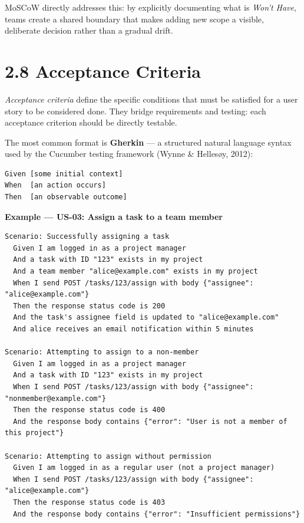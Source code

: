 \documentclass[11pt,a4paper]{book}
\begin{document}
MoSCoW directly addresses this: by explicitly documenting what is \textit{Won't Have}, teams create a shared boundary that makes adding new scope a visible, deliberate decision rather than a gradual drift.

\medskip

\section{2.8 Acceptance Criteria}

\textit{Acceptance criteria} define the specific conditions that must be satisfied for a user story to be considered done. They bridge requirements and testing: each acceptance criterion should be directly testable.

The most common format is \textbf{Gherkin} --- a structured natural language syntax used by the Cucumber testing framework (Wynne \& Hellesøy, 2012):

\begin{lstlisting}
Given [some initial context]
When  [an action occurs]
Then  [an observable outcome]
\end{lstlisting}

\textbf{Example --- US-03: Assign a task to a team member}

\begin{lstlisting}
Scenario: Successfully assigning a task
  Given I am logged in as a project manager
  And a task with ID "123" exists in my project
  And a team member "alice@example.com" exists in my project
  When I send POST /tasks/123/assign with body {"assignee": "alice@example.com"}
  Then the response status code is 200
  And the task's assignee field is updated to "alice@example.com"
  And alice receives an email notification within 5 minutes

Scenario: Attempting to assign to a non-member
  Given I am logged in as a project manager
  And a task with ID "123" exists in my project
  When I send POST /tasks/123/assign with body {"assignee": "nonmember@example.com"}
  Then the response status code is 400
  And the response body contains {"error": "User is not a member of this project"}

Scenario: Attempting to assign without permission
  Given I am logged in as a regular user (not a project manager)
  When I send POST /tasks/123/assign with body {"assignee": "alice@example.com"}
  Then the response status code is 403
  And the response body contains {"error": "Insufficient permissions"}
\end{lstlisting}
\end{document}

